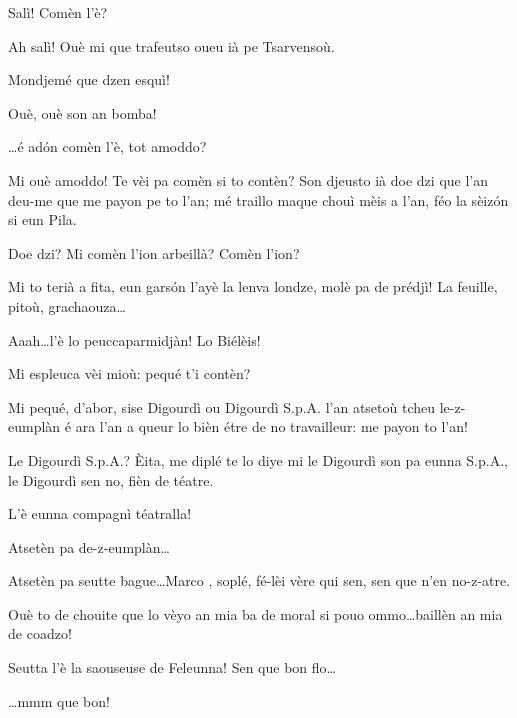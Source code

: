 \begin{drama}




\Cimaspeaks{} Salì! Comèn l'è?

\Jeanspeaks Ah salì! Ouè mi que trafeutso oueu ià pe Tsarvensoù.

\Cimaspeaks Mondjemé que dzen esquì!

\Jeanspeaks Ouè, ouè son an bomba!

\Cimaspeaks \ldots é ad\'on comèn l'è, tot amoddo?

\Jeanspeaks Mi ouè amoddo! Te vèi pa comèn si to contèn? Son djeusto ià doe dzi que l'an deu-me que me payon pe to l'an; mé traillo maque chouì mèis a l'an, féo la sèiz\'on si eun Pila.

\Cimaspeaks {} Doe dzi? Mi comèn l'ion arbeillà? Comèn l'ion?

\Jeanspeaks Mi to terià a fita, eun gars\'on l'ayè la lenva londze, molè pa de prédjì! La feuille, pitoù, grachaouza\ldots

\Cimaspeaks {} Aaah\ldots l'è lo peuccaparmidjàn! Lo Biélèis!

\Marcospeaks Mi espleuca vèi mioù: pequé t'i contèn?

\Jeanspeaks Mi pequé, d'abor, sise Digourdì ou Digourdì S.p.A. l’an atsetoù tcheu le-z-eumplàn é ara l'an a queur lo bièn étre de no travailleur: me payon to l'an!

\Marcospeaks Le Digourdì S.p.A.? Èita, me diplé te lo diye mi le Digourdì son pa eunna S.p.A., le Digourdì sen no, fièn de téatre.

\Cimaspeaks L'è eunna compagnì téatralla!

\Marcospeaks Atsetèn pa de-z-eumplàn\ldots

\Cimaspeaks Atsetèn pa seutte bague\ldots Marco , soplé, fé-lèi vère qui sen, sen que n'en no-z-atre.

\Marcospeaks Ouè to de chouite que lo vèyo an mia ba de moral si pouo ommo\ldots baillèn an mia de coadzo!


\Cimaspeaks {} Seutta l'è la saouseuse de Feleunna! Sen que bon flo\ldots

\Jeanspeaks {} \ldots mmm que bon!


\end{drama}

